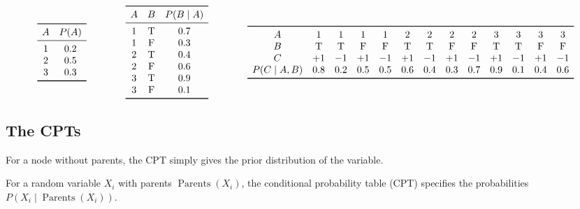 \documentclass[10pt,UTF8]{article}
\theoremstyle{definition}
\newtheorem{definition inner}{Definition}[section]
\theoremstyle{definition}
\newtheorem{theorem inner}{Theorem}[section]
\theoremstyle{definition}
\newtheorem*{proof inner}{\textit{Proof}}
\theoremstyle{plain}
\newtheorem{tip inner}{Tip}[section]
\theoremstyle{remark}
\DeclareMathOperator{\Pa}{Parents} %
\begin{document}
\begin{equation*}
  \begin{array}{c c}
    \toprule
    A & P(A) \\
    \midrule
    1 & 0.2 \\
    2 & 0.5 \\
    3 & 0.3 \\
    \bottomrule
  \end{array}
  \qquad\qquad
  \begin{array}{c c c}
    \toprule
    A & B & P(B \mid A) \\
    \midrule
    1 & \text{T} & 0.7 \\
    1 & \text{F} & 0.3 \\
    2 & \text{T} & 0.4 \\
    2 & \text{F} & 0.6 \\
    3 & \text{T} & 0.9 \\
    3 & \text{F} & 0.1 \\
    \bottomrule
  \end{array}
  \qquad\qquad
  \begin{array}{c c c c c c c c c c c c c}
    \toprule
    A & 1 & 1 & 1 & 1 & 2 & 2 & 2 & 2 & 3 & 3 & 3 & 3\\
    B & \text{T} & \text{T} & \text{F} & \text{F} & \text{T} &
    \text{T} & \text{F} & \text{F} & \text{T} & \text{T} & \text{F} &
    \text{F} \\
    C & +1 & -1 & +1 & -1 & +1 & -1 & +1 & -1 & +1 & -1 & +1 & -1 \\
    P(C \mid A, B) & 0.8 & 0.2 & 0.5 & 0.5 & 0.6 & 0.4 & 0.3 & 0.7 &
    0.9 & 0.1 & 0.4 & 0.6 \\
    \bottomrule
  \end{array}
\end{equation*}

\subsection{The CPTs}

For a node without parents,
the CPT simply gives the prior distribution of the variable.

For a random variable \(X_i\) with parents \(\Pa(X_i)\), the
conditional probability table (CPT) specifies the probabilities
\(P(X_i \mid \Pa(X_i))\).

\bigskip
\end{document}
